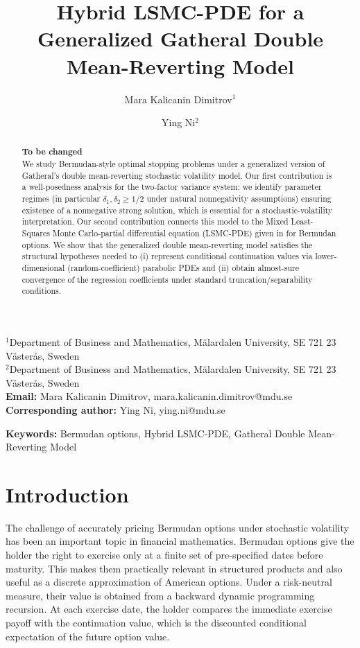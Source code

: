 \documentclass[10pt]{article}
\title{Hybrid LSMC-PDE for a Generalized Gatheral Double Mean-Reverting Model}
\author{%
Mara Kalicanin Dimitrov$^{1}$ \and
Ying Ni$^{2}$%
}
\date{}
\theoremstyle{plain}
\theoremstyle{definition}
\theoremstyle{remark}
\newcommand{\keywords}[1]{\par\noindent\textbf{Keywords:} #1\par}
\begin{document}
\maketitle

\begin{center}
\small
$^{1}$Department of Business and Mathematics, M\"{a}lardalen University, SE 721 23 V\"{a}ster{\aa}s, Sweden\\
$^{2}$Department of Business and Mathematics, M\"{a}lardalen University, SE 721 23 V\"{a}ster{\aa}s, Sweden\\[4pt]
\textbf{Email:} Mara Kalicanin Dimitrov, mara.kalicanin.dimitrov@mdu.se\\
\textbf{Corresponding author:} Ying Ni, ying.ni@mdu.se\\
\end{center}

\begin{abstract}
\textbf{To be changed}\\
We study Bermudan-style optimal stopping problems under a generalized version of Gatheral's
double mean-reverting stochastic volatility model. Our first contribution is a well-posedness analysis for the
two-factor variance system: we identify parameter regimes (in particular $\delta_1,\delta_2\ge 1/2$
under natural nonnegativity assumptions) ensuring existence of a nonnegative strong solution,
which is essential for a stochastic-volatility interpretation.
Our second contribution connects this model to the Mixed Least-Squares Monte Carlo-partial
differential equation (LSMC-PDE) given in \citet{farahany2020mixing} for Bermudan
options. We show that the generalized double
mean-reverting model satisfies the structural hypotheses needed to (i) represent conditional
continuation values via lower-dimensional (random-coefficient) parabolic PDEs and (ii) obtain
almost-sure convergence of the regression coefficients under standard truncation/separability
conditions.
\end{abstract}

\keywords{Bermudan options, Hybrid LSMC-PDE, Gatheral Double Mean-Reverting Model}


\section{Introduction}

The challenge of accurately pricing Bermudan options under stochastic volatility has been an important topic in financial mathematics. Bermudan options give the holder the right to exercise only at a finite set of pre-specified dates before maturity. This makes them practically relevant in structured products and also useful as a discrete approximation of American options. Under a risk-neutral measure, their value is obtained from a backward dynamic programming recursion. At each exercise date, the holder compares the immediate exercise payoff with the continuation value, which is the discounted conditional expectation of the future option value.
\end{document}
